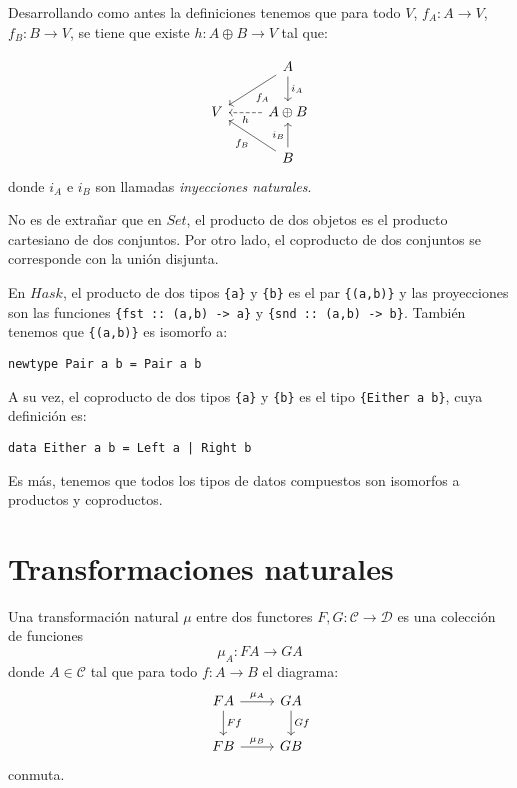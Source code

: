 \documentclass[12pt, twoside]{book}
\newcommand{\code}[1]{\Verb+{#1}+}
\newcommand{\cat}{{\mathcal{C}}}
\newcommand{\Set}{{Set}}
\newcommand{\Hask}{{Hask}}
\begin{document}
Desarrollando como antes la definiciones tenemos que para todo $V$, $f_A \colon A \to V$, $f_B \colon B \to V$, se tiene que existe $h \colon A \oplus B \to V$ tal que:

\[\begin{tikzcd}
 & A \arrow[dl,"f_A"] \arrow[d,"i_A"]\\
V & A \oplus B \arrow[l,dashed,"h"]\\
 & B \arrow[ul,"f_B"] \arrow[u,"i_B"]
\end{tikzcd}\]
donde $i_A$ e $i_B$ son llamadas \emph{inyecciones naturales}.

\begin{example}
No es de extrañar que en $\Set$, el producto de dos objetos es el producto cartesiano de dos conjuntos.
Por otro lado, el coproducto de dos conjuntos se corresponde con la unión disjunta.
\end{example}

\begin{example}
En $\Hask$, el producto de dos tipos \code{a} y \code{b} es el par \code{(a,b)} y las proyecciones son las funciones \code{fst :: (a,b) -> a} y \code{snd :: (a,b) -> b}.
También tenemos que \code{(a,b)} es isomorfo a:
\begin{verbatim}
newtype Pair a b = Pair a b
\end{verbatim}
A su vez, el coproducto de dos tipos \code{a} y \code{b} es el tipo \code{Either a b}, cuya definición es:
\begin{verbatim}
data Either a b = Left a | Right b
\end{verbatim}
Es más, tenemos que todos los tipos de datos compuestos son isomorfos a productos y coproductos.
\end{example}

\section{Transformaciones naturales}
\begin{definition}
Una transformación natural $\mu$ entre dos functores $F, G \colon \cat \to \mathcal{D}$ es una colección de funciones
\[ \mu_A \colon F A \to G A \]
donde $A \in \cat$ tal que para todo $f \colon A \to B$ el diagrama:
\[
\begin{tikzcd}
F A \arrow[r,"\mu_A"] \arrow[d,"F f"] & G A \arrow[d,"G f"]\\
F B \arrow[r,"\mu_B"] & G B
\end{tikzcd}
\]
conmuta.
\end{definition}
\end{document}
